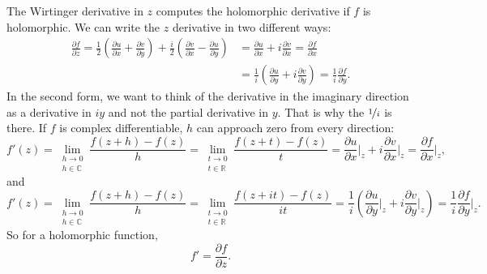 \documentclass[12pt,openany]{book}
\newcommand{\C}{{\mathbb{C}}}
\newcommand{\R}{{\mathbb{R}}}
\theoremstyle{plain}
\theoremstyle{remark}
\theoremstyle{definition}
\theoremstyle{exercise}
\theoremstyle{example}
\begin{document}
The Wirtinger derivative in $z$ computes the holomorphic derivative
if $f$ is holomorphic.  We can write
the $z$ derivative in two different ways:
\begin{equation*}
\begin{split}
\frac{\partial f}{\partial z} 
=
\frac{1}{2}
\left(
\frac{\partial u}{\partial x} 
+ \frac{\partial v}{\partial y}
\right)
+
\frac{i}{2}
\left( \frac{\partial v}{\partial x} - \frac{\partial u}{\partial y}
\right) 
& =
\frac{\partial u}{\partial x} 
+ i \frac{\partial v}{\partial x}
 =
\frac{\partial f}{\partial x}
\\
& =
\frac{1}{i} \left(
\frac{\partial u}{\partial y}
+ i
\frac{\partial v}{\partial y} 
\right)
 =
\frac{1}{i}
\frac{\partial f}{\partial y}
.
\end{split}
\end{equation*}
In the second form, we want to think of the derivative in
the imaginary direction as a derivative in $iy$ and not the partial
derivative in $y$.  That is why the $\nicefrac{1}{i}$ is there.
If $f$ is complex differentiable, $h$ can
approach zero from every direction:
\begin{equation*}
f'(z) =
\lim_{\substack{h \to 0\\h\in\C}}
\frac{f(z+h)-f(z)}{h}
=
\lim_{\substack{t \to 0\\t\in\R}}
\frac{f(z+t)-f(z)}{t}
=
\frac{\partial u}{\partial x} \Big|_z
+ i \frac{\partial v}{\partial x}\Big|_z
 =
\frac{\partial f}{\partial x} \Big|_z ,
\end{equation*}
and
\begin{equation*}
f'(z) =
\lim_{\substack{h \to 0\\h\in\C}}
\frac{f(z+h)-f(z)}{h}
=
\lim_{\substack{t \to 0\\t\in\R}}
\frac{f(z+it)-f(z)}{it}
=
\frac{1}{i}
\left(
\frac{\partial u}{\partial y}  \Big|_z
+ i \frac{\partial v}{\partial y} \Big|_z
\right)
 =
\frac{1}{i}
\frac{\partial f}{\partial y} \Big|_z .
\end{equation*}
So for a holomorphic function,
\begin{equation*}
f' =
\frac{\partial f}{\partial z} .
\end{equation*}
\end{document}
